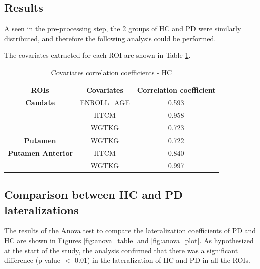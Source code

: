 \documentclass[]{article}
\begin{document}
\begin{multicols}{2}
\section{Results}

A seen in the pre-processing step, the 2 groups of HC and PD were similarly distributed, and therefore the following analysis could be performed.

The covariates extracted for each ROI are shown in Table \ref{tbl:cov_hc}.

\end{multicols}

\begin{table}[h]
	\centering
	\begin{tabular}{|c|c|c|}
		\hline
		\textbf{ROIs}             & \textbf{Covariates} & \textbf{Correlation coefficient} \\ \hline
		\textbf{Caudate}          & ENROLL\_AGE         & 0.593                            \\ \hline
		\textbf{}                 & HTCM                & 0.958                            \\ \hline
		\textbf{}                 & WGTKG               & 0.723                            \\ \hline
		\textbf{Putamen}          & WGTKG               & 0.722                            \\ \hline
		\textbf{Putamen Anterior} & HTCM                & 0.840                            \\ \hline
		\textbf{}                 & WGTKG               & 0.997                            \\ \hline
	\end{tabular}
	\caption{Covariates correlation coefficients - HC}
	\label{tbl:cov_hc}
\end{table}

\begin{multicols}{2}

\subsection{Comparison between HC and PD lateralizations}

The results of the Anova test to compare the lateralization coefficients of PD and HC are shown in Figures \ref{fig:anova_table} and \ref{fig:anova_plot}.
As hypothesized at the start of the study, the analysis confirmed that there was a significant difference (p-value $<$ 0.01) in the lateralization of HC and PD in all the ROIs.

\end{multicols}
\end{document}
